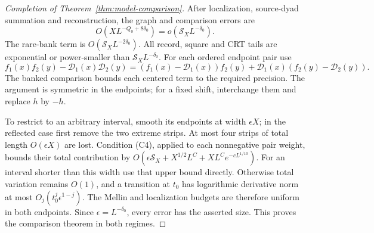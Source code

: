 \begin{proof}[Completion of Theorem~\ref{thm:model-comparison}]
After localization, source-dyad summation and reconstruction, the graph
and comparison errors are
\[
 O(XL^{-Q_0+8\delta_0})=o(\mathcal S_XL^{-\delta_0}).
\]
The rare-bank term is \(O(\mathcal S_XL^{-2\delta_0})\).
All record, square and CRT tails are exponential or power-smaller
than \(\mathcal S_XL^{-\delta_0}\).
For each ordered endpoint pair use
\[
 f_1(x)f_2(y)-\mathcal D_1(x)\mathcal D_2(y)
 =(f_1(x)-\mathcal D_1(x))f_2(y)+\mathcal D_1(x)(f_2(y)-\mathcal D_2(y)).
\]
The banked comparison bounds each centered term to the required
precision. The argument is symmetric in the endpoints; for a fixed
shift, interchange them and replace \(h\) by \(-h\).

To restrict to an arbitrary interval, smooth its endpoints at width
\(\epsilon X\); in the reflected case first remove the two extreme
strips. At most four strips of total length \(O(\epsilon X)\)
are lost. Condition (C4), applied to each nonnegative pair weight,
bounds their total contribution by
\(O(\epsilon\mathcal S_X+X^{1/2}L^C+XL^Ce^{-cL^{1/10}})\).
For an interval shorter than this width use that upper bound directly.
Otherwise total variation remains \(O(1)\), and a transition at
\(t_0\) has logarithmic derivative norm at most
\(O_j(t_0^j\epsilon^{1-j})\). The Mellin and localization budgets
are therefore uniform in both endpoints. Since
\(\epsilon=L^{-\delta_0}\), every error has the asserted size.
This proves the comparison theorem in both regimes.
\end{proof}
